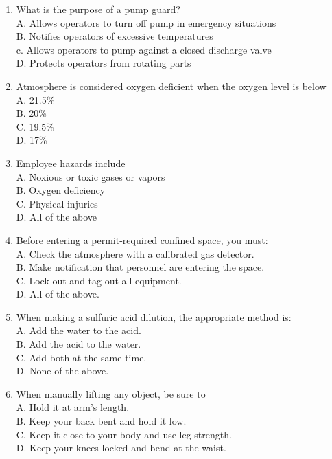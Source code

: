 \begin{enumerate}[1.]
\item What is the purpose of a pump guard?\\
A.	Allows operators to turn off pump in emergency situations\\
B.	Notifies operators of excessive temperatures\\
c.	Allows operators to pump against a closed discharge valve\\
D.	Protects operators from rotating parts

\item Atmosphere is considered oxygen deficient when the oxygen level is below\\
A.	21.5\%\\
B.	20\%\\
C.	19.5\%\\
D.  17\%


\item Employee hazards include\\
A. Noxious or toxic gases or vapors\\
B. Oxygen deficiency\\
C. Physical injuries\\
D. All of the above\\

\item Before entering a permit-required confined space, you must:\\
A. Check the atmosphere with a calibrated gas detector.\\
B. Make notification that personnel are entering the space.\\
C. Lock out and tag out all equipment.\\
D. All of the above.
	 
\item When making a sulfuric acid dilution, the appropriate method is:\\
A. Add the water to the acid.\\
B. Add the acid to the water.\\
C. Add both at the same time.\\
D. None of the above.

\item When manually lifting any object, be sure to\\
A. Hold it at arm's length.\\
B. Keep your back bent and hold it low.\\
C. Keep it close to your body and use leg strength.\\
D. Keep your knees locked and bend at the waist.



\end{enumerate}
